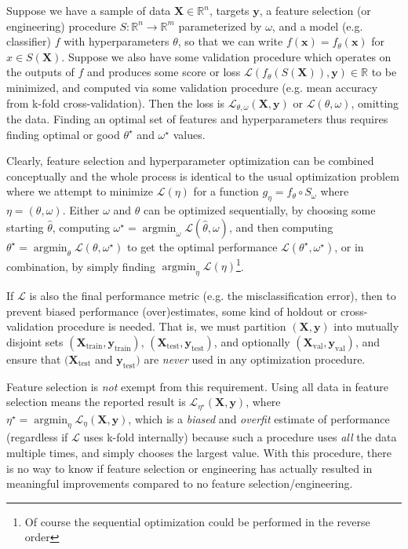 \documentclass[10pt]{article}
\newcommand{\tsub}[2]{\mathbf{#1}_{\text{#2}}}
\DeclareMathOperator*{\argmin}{\arg\min}
\begin{document}
Suppose we have a sample of data \(\mathbf{X} \in \mathbb{R}^n\), targets \(\mathbf{y}\), a feature
selection (or engineering) procedure \(S: \mathbb{R}^n \rightarrow \mathbb{R}^m\) parameterized by
\(\omega\), and a model (e.g. classifier) \(f\) with hyperparameters \(\theta\), so that we can
write \(f(\bm{x}) = f_{\theta}(\mathbf{x})\) for \(x \in S(\mathbf{X})\).  Suppose we also have some
validation procedure which operates on the outputs of \(f\) and produces some score or loss
\(\mathcal{L}(f_{\theta}(S(\mathbf{X})), \mathbf{y}) \in \mathbb{R}\) to be minimized, and computed
via some validation procedure (e.g. mean accuracy from k-fold cross-validation). Then the loss is
\(\mathcal{L}_{\theta, \omega}(\mathbf{X}, \mathbf{y})\) or \(\mathcal{L}(\theta, \omega)\),
omitting the data. Finding an optimal set of features and hyperparameters thus requires finding
optimal or good \(\theta^{\star}\) and \(\omega^{\star}\) values.

Clearly, feature selection and hyperparameter optimization can be combined conceptually and the
whole process is identical to the usual optimization problem where we attempt to minimize
\(\mathcal{L}(\eta)\) for a function \( g_{\eta} = f_{\theta} \circ S_{\omega}\) where \( \eta =
(\theta, \omega) \). Either \(\omega\) and \(\theta\) can be optimized sequentially, by choosing
some starting \(\hat{\theta}\), computing \(\omega^{\star} = \argmin_{\omega}
\mathcal{L}(\hat{\theta}, \omega)\), and then computing \(\theta^{\star} = \argmin_{\theta}
\mathcal{L}(\theta, \omega^{\star})\) to get the optimal performance \(\mathcal{L}(\theta^{\star},
\omega^{\star})\), or in combination, by simply finding \(\argmin_{\eta} \mathcal{L}(\eta)\)\footnote{Of course the sequential optimization could be performed in the reverse order}.

If \(\mathcal{L}\) is also the final performance metric (e.g. the
misclassification error), then to prevent  biased performance (over)estimates, some kind of holdout or cross-validation
procedure is needed. That is, we must partition \((\mathbf{X}, \mathbf{y})\) into mutually disjoint sets
\((\tsub{X}{train}, \tsub{y}{train})\), \((\tsub{X}{test}, \tsub{y}{test})\), and optionally
\((\tsub{X}{val}, \tsub{y}{val})\), and ensure that  \((\tsub{X}{test}\) and \(\tsub{y}{test})\) are
\emph{never} used in any optimization procedure.

Feature selection is \emph{not} exempt from this requirement. Using all data in feature selection
means the reported result is \(\mathcal{L}_{\eta^{\star}}(\mathbf{X}, \mathbf{y})\), where
\(\eta^{\star} = \argmin_{\eta} \mathcal{L}_{\eta}(\mathbf{X}, \mathbf{y})\), which is a
\emph{biased} and \emph{overfit} estimate of performance (regardless if \(\mathcal{L}\) uses k-fold
internally) because such a procedure uses \emph{all} the data multiple times, and simply chooses the
largest value. With this procedure, there is no way to know if feature selection or engineering has
actually resulted in meaningful improvements compared to no feature selection/engineering.
\end{document}
